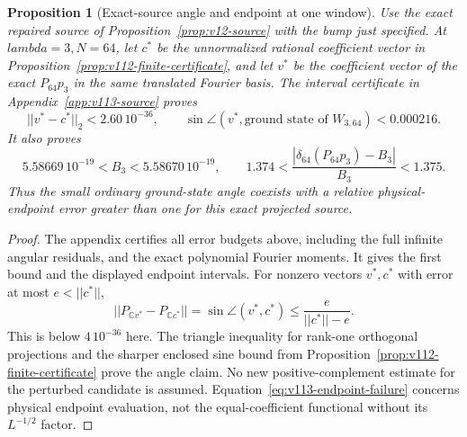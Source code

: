\documentclass[11pt]{article}
\def\lambda{lambda}%
\def\norm#1{||#1||}%
\newtheorem{proposition}[theorem]{Proposition}
\theoremstyle{remark}
\newcommand{\norm}[1]{\left\lVert #1\right\rVert}
\begin{document}
\begin{proposition}[Exact-source angle and endpoint at one window]
\label{prop:v113-source-certificate}
Use the exact repaired source of Proposition~\ref{prop:v12-source}
with the bump just specified. At $\lambda=3,N=64$, let $c^*$ be the
unnormalized rational coefficient vector in
Proposition~\ref{prop:v112-finite-certificate}, and let $v^*$ be the
coefficient vector of the exact $P_{64}p_3$ in the same translated
Fourier basis. The interval certificate in
Appendix~\ref{app:v113-source} proves
\[
 \norm{v^*-c^*}_2<2.60\,10^{-36},\qquad
 \sin\angle(v^*,\text{ground state of }W_{3,64})<0.000216.
\]
It also proves
\begin{equation}\label{eq:v113-endpoint-failure}
 5.58669\,10^{-19}<B_3<5.58670\,10^{-19},\qquad
 1.374<\frac{|\delta_{64}(P_{64}p_3)-B_3|}{B_3}<1.375.
\end{equation}
Thus the small ordinary ground-state angle coexists with a relative
physical-endpoint error greater than one for this exact projected source.
\end{proposition}
\begin{proof}
The appendix certifies all error budgets above, including the full
infinite angular residuals, and the exact polynomial Fourier moments.
It gives the first bound and the displayed endpoint intervals.
For nonzero vectors $v^*,c^*$ with error at most $e<\norm{c^*}$,
\[
 \norm{P_{\mathbb Cv^*}-P_{\mathbb Cc^*}}
 =\sin\angle(v^*,c^*)\le\frac{e}{\norm{c^*}-e}.
\]
This is below $4\,10^{-36}$ here. The triangle inequality for rank-one
orthogonal projections and the sharper enclosed sine bound from
Proposition~\ref{prop:v112-finite-certificate} prove the angle claim.
No new positive-complement estimate for the perturbed candidate is
assumed. Equation~\eqref{eq:v113-endpoint-failure} concerns physical
endpoint evaluation, not the equal-coefficient functional without its
$L^{-1/2}$ factor.
\end{proof}
\end{document}
